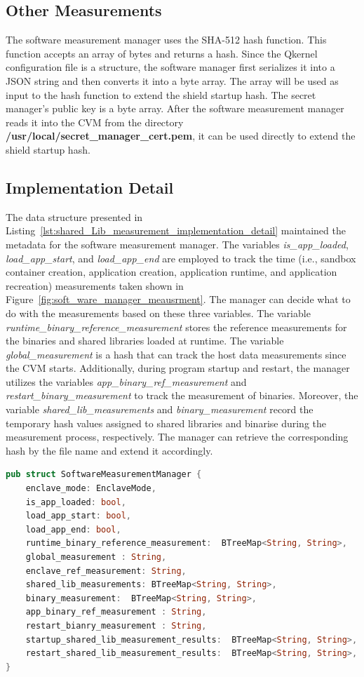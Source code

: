 \subsection{Other Measurements}
The software measurement manager uses the SHA-512 hash function. This function accepts an array of bytes and returns a hash. Since the Qkernel configuration file is a structure, the software manager first serializes it into a JSON string and then converts it into a byte array. The array will 
be used as input to the hash function to extend the shield startup hash. The secret manager's public key is a byte array. After the software measurement manager reads it into the \acrshort{CVM} from the directory \textbf{/usr/local/secret\_manager\_cert.pem}, it can be used directly to extend 
the shield startup hash.

\subsection{Implementation Detail}
The data structure presented in Listing~\ref{lst:shared_Lib_measurement_implementation_detail} maintained the metadata for the software measurement manager. The variables \emph{is\_app\_loaded}, \emph{load\_app\_start}, and \emph{load\_app\_end} are employed to track the time (i.e., sandbox container creation, application creation, application runtime, 
and application recreation) measurements taken shown in Figure~\ref{fig:soft_ware_manager_meausrment}. The manager can decide what to do with the measurements based on these three variables. The variable \emph{runtime\_binary\_reference\_measurement} stores the reference measurements for the binaries 
and shared libraries loaded at runtime. The variable \emph{global\_measurement} is a hash that can track the host data measurements since the \acrshort{CVM} starts. Additionally, during program startup and restart, the manager utilizes the variables \emph{app\_binary\_ref\_measurement} and 
\emph{restart\_binary\_measurement} to track the measurement of binaries. Moreover, the variable \emph{shared\_lib\_measurements} and \emph{binary\_measurement} record the temporary hash values assigned to shared libraries and binarise during the measurement process, respectively. 
The manager can retrieve the corresponding hash by the file name and extend it accordingly.


\begin{lstlisting}[language=rust, caption= Interface for accessing the file type secrets, label={lst:shared_Lib_measurement_implementation_detail}]
pub struct SoftwareMeasurementManager {
    enclave_mode: EnclaveMode,
    is_app_loaded: bool,
    load_app_start: bool,
    load_app_end: bool,
    runtime_binary_reference_measurement:  BTreeMap<String, String>,
    global_measurement : String,
    enclave_ref_measurement: String,
    shared_lib_measurements: BTreeMap<String, String>,
    binary_measurement:  BTreeMap<String, String>,
    app_binary_ref_measurement : String,
    restart_bianry_measurement : String,
    startup_shared_lib_measurement_results:  BTreeMap<String, String>,
    restart_shared_lib_measurement_results:  BTreeMap<String, String>,
}
\end{lstlisting}

